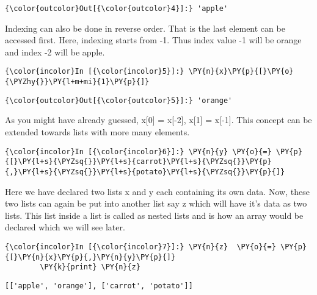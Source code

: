             \begin{Verbatim}[commandchars=\\\{\}]
{\color{outcolor}Out[{\color{outcolor}4}]:} 'apple'
\end{Verbatim}
        
    Indexing can also be done in reverse order. That is the last element can
be accessed first. Here, indexing starts from -1. Thus index value -1
will be orange and index -2 will be apple.

    \begin{Verbatim}[commandchars=\\\{\}]
{\color{incolor}In [{\color{incolor}5}]:} \PY{n}{x}\PY{p}{[}\PY{o}{\PYZhy{}}\PY{l+m+mi}{1}\PY{p}{]}
\end{Verbatim}

            \begin{Verbatim}[commandchars=\\\{\}]
{\color{outcolor}Out[{\color{outcolor}5}]:} 'orange'
\end{Verbatim}
        
    As you might have already guessed, x{[}0{]} = x{[}-2{]}, x{[}1{]} =
x{[}-1{]}. This concept can be extended towards lists with more many
elements.

    \begin{Verbatim}[commandchars=\\\{\}]
{\color{incolor}In [{\color{incolor}6}]:} \PY{n}{y} \PY{o}{=} \PY{p}{[}\PY{l+s}{\PYZsq{}}\PY{l+s}{carrot}\PY{l+s}{\PYZsq{}}\PY{p}{,}\PY{l+s}{\PYZsq{}}\PY{l+s}{potato}\PY{l+s}{\PYZsq{}}\PY{p}{]}
\end{Verbatim}

    Here we have declared two lists x and y each containing its own data.
Now, these two lists can again be put into another list say z which will
have it's data as two lists. This list inside a list is called as nested
lists and is how an array would be declared which we will see later.

    \begin{Verbatim}[commandchars=\\\{\}]
{\color{incolor}In [{\color{incolor}7}]:} \PY{n}{z}  \PY{o}{=} \PY{p}{[}\PY{n}{x}\PY{p}{,}\PY{n}{y}\PY{p}{]}
        \PY{k}{print} \PY{n}{z}
\end{Verbatim}

    \begin{Verbatim}[commandchars=\\\{\}]
[['apple', 'orange'], ['carrot', 'potato']]
    \end{Verbatim}

